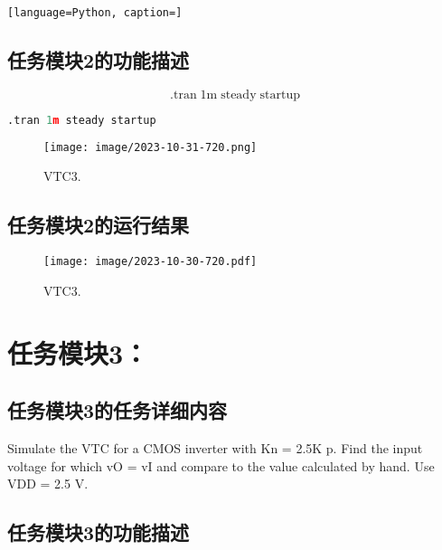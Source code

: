 \documentclass[lang=cn,10pt]{elegantbook}
\begin{document}
\begin{lstlisting}[language=Python, caption=]
\end{lstlisting}

\subsection{任务模块2的功能描述}

\begin{equation*}
\mathrm{.tran}\;\mathrm{1m}\;\mathrm{steady}\;\mathrm{startup}
\end{equation*}

\begin{lstlisting}[language=Python, caption=transient response]
.tran 1m steady startup
\end{lstlisting}

\begin{figure}[htb]
\begin{center}
\texttt{[image: image/2023-10-31-720.png]}
\end{center}
\vspace{-0.1in}  
\caption{VTC3.}
\label{fig:VTC3}
\end{figure}

\subsection{任务模块2的运行结果}

\begin{figure}[htb]
\begin{center}
\texttt{[image: image/2023-10-30-720.pdf]}
\end{center}
\vspace{-0.1in}  
\caption{VTC3.}
\label{fig:VTC3_results}
\end{figure}

\section{任务模块3：}

\subsection{任务模块3的任务详细内容}

Simulate the VTC for a CMOS inverter with Kn =
2.5K p. Find the input voltage for which vO = vI
and compare to the value calculated by hand. Use
VDD = 2.5 V.

\subsection{任务模块3的功能描述}
\end{document}
